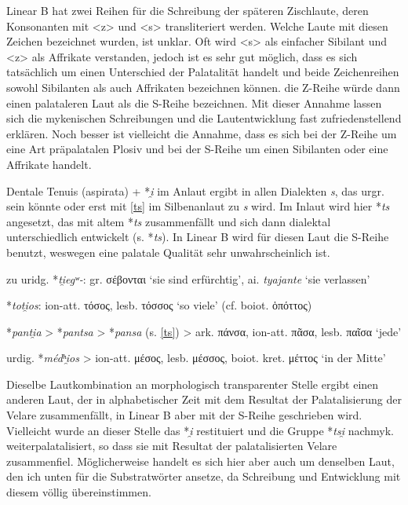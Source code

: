 \documentclass[12pt,a4paper,normalheadings]{scrartcl}
\def\rek#1{*\textit{#1}}
\def\bel#1{\textit{#1}}
\begin{document}
Linear B hat zwei Reihen für die Schreibung der späteren Zischlaute,
deren Konsonanten mit <z> und <s> transliteriert werden.
Welche Laute mit diesen Zeichen bezeichnet wurden, ist unklar.
Oft wird <s> als einfacher Sibilant und <z> als Affrikate verstanden,
jedoch ist es sehr gut möglich,
dass es sich tatsächlich um einen Unterschied der Palatalität handelt
und beide Zeichenreihen sowohl Sibilanten als auch Affrikaten bezeichnen können.
die Z-Reihe würde dann einen palataleren Laut als die S-Reihe bezeichnen.
Mit dieser Annahme lassen sich die mykenischen Schreibungen
und die Lautentwicklung fast zufriedenstellend erklären.
Noch besser ist vielleicht die Annahme,
dass es sich bei der Z-Reihe um eine Art präpalatalen Plosiv
und bei der S-Reihe um einen Sibilanten oder eine Affrikate handelt.

Dentale Tenuis (aspirata) + \rek{i̯} im Anlaut ergibt in allen Dialekten \bel{s},
das urgr. sein könnte oder erst mit \ref{ts} im Silbenanlaut zu \bel{s} wird.
Im Inlaut wird hier \rek{ts} angesetzt, das mit altem \rek{ts} zusammenfällt
und sich dann dialektal unterschiedlich entwickelt (s. \rek{ts}).
In Linear B wird für diesen Laut die S-Reihe benutzt,
weswegen eine palatale Qualität sehr unwahrscheinlich ist.

\lex{\rek{(t, tʰ)i̯}}{\rek{s}}{\#\_}

zu uridg. \rek{ti̯egʷ-}: gr. σέβονται `sie sind erfürchtig', ai. \bel{tyajante} `sie verlassen'

\lex{\rek{(t, tʰ)i̯}}{\rek{ts}}{\_}

\rek{toti̯os}: ion-att. τόσος, lesb. τόσσος `so viele' (cf. boiot. ὁπόττος)

\rek{panti̯a} > \rek{pantsa} > \rek{pansa} (s. \ref{ts}) >
ark. πάνσα, ion-att. πᾶσα, lesb. παῖσα `jede'

urdig. \rek{médʰi̯os} > ion-att. μέσος, lesb. μέσσος, boiot. kret. μέττος `in der Mitte'

\bigskip\noindent
Dieselbe Lautkombination an morphologisch transparenter Stelle
ergibt einen anderen Laut,
der in alphabetischer Zeit mit dem Resultat der Palatalisierung der
Velare zusammenfällt,
in Linear B aber mit der S-Reihe geschrieben wird.
Vielleicht wurde an dieser Stelle das \rek{i̯} restituiert
und die Gruppe \rek{tsi̯} nachmyk. weiterpalatalisiert,
so dass sie mit Resultat der palatalisierten Velare zusammenfiel.
Möglicherweise handelt es sich hier aber auch um denselben Laut,
den ich unten für die Substratwörter ansetze,
da Schreibung und Entwicklung mit diesem völlig übereinstimmen.
\end{document}
